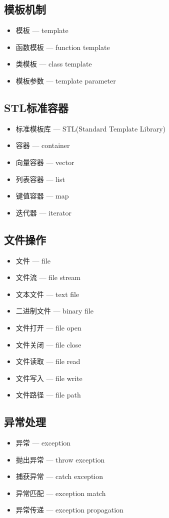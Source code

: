 \subsection{模板机制}
\begin{itemize}
\item 模板 — template
\item 函数模板 — function template
\item 类模板 — class template
\item 模板参数 — template parameter
\end{itemize}

\subsection{STL标准容器}
\begin{itemize}
\item 标准模板库 — STL(Standard Template Library)
\item 容器 — container
\item 向量容器 — vector
\item 列表容器 — list
\item 键值容器 — map
\item 迭代器 — iterator
\end{itemize}

\subsection{文件操作}
\begin{itemize}
\item 文件 — file
\item 文件流 — file stream
\item 文本文件 — text file
\item 二进制文件 — binary file
\item 文件打开 — file open
\item 文件关闭 — file close
\item 文件读取 — file read
\item 文件写入 — file write
\item 文件路径 — file path
\end{itemize}

\subsection{异常处理}
\begin{itemize}
\item 异常 — exception
\item 抛出异常 — throw exception
\item 捕获异常 — catch exception
\item 异常匹配 — exception match
\item 异常传递 — exception propagation
\end{itemize}
